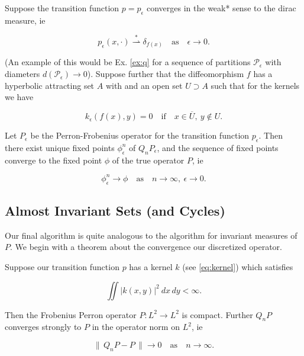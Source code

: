 \begin{proposition}
    \cite*{attr, measure, algGAIO, perturbationsbook, perturbationsart} 
    Suppose the transition function $p = p_\epsilon$ converges in the weak* sense to the 
    dirac measure, ie 

    \begin{equation}
        p_\epsilon (x, \cdot) \overset{*}{\rightharpoonup} \delta_{f(x)} 
        \quad\text{as}\quad \epsilon \to 0.
    \end{equation}

    (An example of this would be Ex. \ref{ex:q} for a sequence of partitions 
    $\mathcal{P}_\epsilon$ with diameters $d(\mathcal{P}_\epsilon) \to 0$).
    Suppose further that the diffeomorphism $f$ has a hyperbolic attracting set $A$ with
    and an open set $U \supset A$ such that for the kernels we have

    \begin{equation}
        k_\epsilon (f(x), y) = 0 \quad\text{if}\quad x \in \overline{U},\ y \notin U.
    \end{equation}

    Let $P_\epsilon$ be the Perron-Frobenius operator for the transition function 
    $p_\epsilon$. Then there exist unique fixed points $\phi_\epsilon^n$ of $Q_n P_\epsilon$, 
    and the sequence of fixed points converge to the fixed point $\phi$ of the true 
    operator $P$, ie

    \begin{equation}
        \phi_\epsilon^n \to \phi 
        \quad\text{as}\quad n \to \infty,\ \epsilon \to 0.
    \end{equation}

\end{proposition}


\subsection{Almost Invariant Sets (and Cycles)}

Our final algorithm is quite analogous to the algorithm for invariant measures of $P$. We 
begin with a theorem about the convergence our discretized operator.

\begin{theorem}
    \label{thm:QnP}
    \cite*{attr}
    Suppose our transition function $p$ has a kernel $k$ (see \autoref{eq:kernel}) which 
    satisfies 

    \begin{equation}
        \iint |k(x, y)|^2\ dx\,dy < \infty. 
    \end{equation}

    Then the Frobenius Perron operator $P : L^2 \to L^2$ is compact. Further $Q_n P$ 
    converges strongly to $P$ in the operator norm on $L^2$, ie

    \begin{equation}
        \|\, Q_n P - P \,\| \to 0 \quad \text{as} \quad n \to \infty .
    \end{equation}

\end{theorem}

